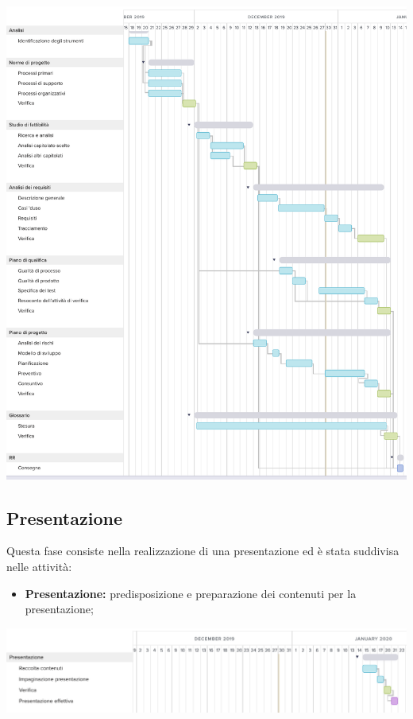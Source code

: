 \includegraphics[width=\textwidth]{res/img/g1}

\subsection{Presentazione}
Questa fase consiste nella realizzazione di una presentazione ed è stata suddivisa nelle attività:
\begin{itemize}
	\item \textbf{Presentazione:} predisposizione e preparazione dei contenuti per la presentazione;
\end{itemize}
\includegraphics[width=\textwidth]{res/img/g2}

